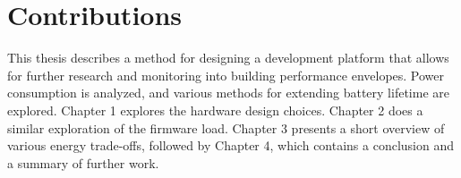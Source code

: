 \section{Contributions}

This thesis describes a method for designing a development platform that allows for further research and monitoring into building performance envelopes. Power consumption is analyzed, and various methods for extending battery lifetime are explored. Chapter 1 explores the hardware design choices. Chapter 2 does a similar exploration of the firmware load. Chapter 3 presents a short overview of various energy trade-offs, followed by Chapter 4, which contains a conclusion and a summary of further work.